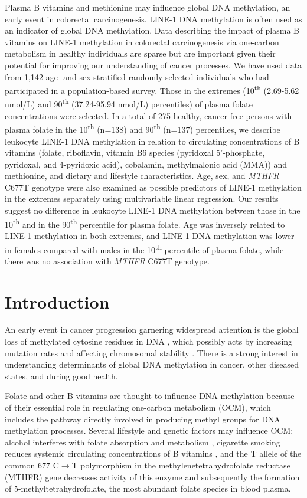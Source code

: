 \noindent Plasma B vitamins and methionine may influence global DNA methylation, an early event in colorectal carcinogenesis. LINE-1 DNA methylation is often used as an indicator of global DNA methylation. Data describing the impact of plasma B vitamins on LINE-1 methylation in colorectal carcinogenesis via one-carbon metabolism in healthy individuals are sparse but are important given their potential for improving our understanding of cancer processes. We have used data from 1,142 age- and sex-stratified randomly selected individuals who had participated in a population-based survey. Those in the extremes (10\textsuperscript{th} (2.69-5.62 nmol/L) and 90\textsuperscript{th} (37.24-95.94 nmol/L) percentiles) of plasma folate concentrations were selected. In a total of 275 healthy, cancer-free persons with plasma folate in the 10\textsuperscript{th} (n=138) and 90\textsuperscript{th} (n=137) percentiles, we describe leukocyte LINE-1 DNA methylation in relation to circulating concentrations of B vitamins (folate, riboflavin, vitamin B6 species (pyridoxal 5'-phosphate, pyridoxal, and 4-pyridoxic acid), cobalamin, methylmalonic acid (MMA)) and methionine, and dietary and lifestyle characteristics. Age, sex, and \emph{MTHFR} C677T genotype were also examined as possible predictors of LINE-1 methylation in the extremes separately using multivariable linear regression. Our results suggest no difference in leukocyte LINE-1 DNA methylation between those in the 10\textsuperscript{th} and in the 90\textsuperscript{th} percentile for plasma folate. Age was inversely related to LINE-1 methylation in both extremes, and LINE-1 DNA methylation was lower in females compared with males in the 10\textsuperscript{th} percentile of plasma folate, while there was no association with \emph{MTHFR} C677T genotype.

\newpage

\section{Introduction} %
\noindent An early event in cancer progression garnering widespread attention is the global loss of methylated cytosine residues in DNA \cite{c31,c32}, which possibly acts by increasing mutation rates and affecting chromosomal stability \cite{c33,c34}. There is a strong interest in understanding determinants of global DNA methylation in cancer, other diseased states, and during good health.

\noindent Folate and other B vitamins are thought to influence DNA methylation because of their essential role in regulating one-carbon metabolism (OCM), which includes the pathway directly involved in producing methyl groups for DNA methylation processes. Several lifestyle and genetic factors may influence OCM: alcohol interferes with folate absorption and metabolism \cite{c35}, cigarette smoking reduces systemic circulating concentrations of B vitamins \cite{c36}, and the T allele of the common 677 C$\rightarrow$T polymorphism in the methylenetetrahydrofolate reductase (MTHFR) gene decreases activity of this enzyme and subsequently the formation of 5-methyltetrahydrofolate, the most abundant folate species in blood plasma.

